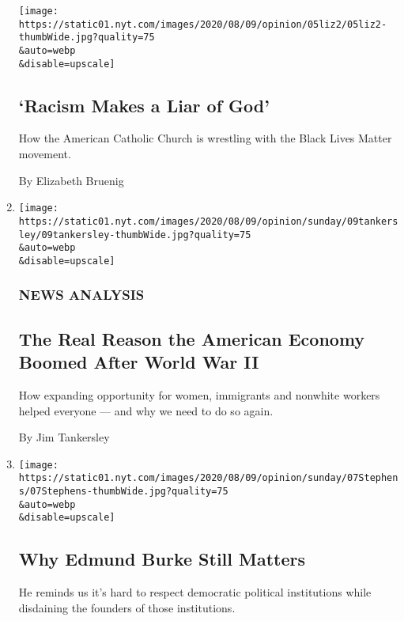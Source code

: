 \begin{enumerate}
  \texttt{[image: https://static01.nyt.com/images/2020/08/09/opinion/05liz2/05liz2-thumbWide.jpg?quality=75\\\&auto=webp\\\&disable=upscale]}

  \hypertarget{racism-makes-a-liar-of-god}{%
  \subsection{`Racism Makes a Liar of
  God'}\label{racism-makes-a-liar-of-god}}

  How the American Catholic Church is wrestling with the Black Lives
  Matter movement.

  By Elizabeth Bruenig
\item
  \href{/2020/08/06/sunday-review/middle-class-prosperity.html}{}

  \texttt{[image: https://static01.nyt.com/images/2020/08/09/opinion/sunday/09tankersley/09tankersley-thumbWide.jpg?quality=75\\\&auto=webp\\\&disable=upscale]}

  \hypertarget{news-analysis}{%
  \subsubsection{NEWS ANALYSIS}\label{news-analysis}}

  \hypertarget{the-real-reason-the-american-economy-boomed-after-world-war-ii}{%
  \subsection{The Real Reason the American Economy Boomed After World
  War
  II}\label{the-real-reason-the-american-economy-boomed-after-world-war-ii}}

  How expanding opportunity for women, immigrants and nonwhite workers
  helped everyone --- and why we need to do so again.

  By Jim Tankersley
\item
  \href{/2020/08/05/opinion/sunday/edmund-burke.html}{}

  \texttt{[image: https://static01.nyt.com/images/2020/08/09/opinion/sunday/07Stephens/07Stephens-thumbWide.jpg?quality=75\\\&auto=webp\\\&disable=upscale]}

  \hypertarget{why-edmund-burke-still-matters}{%
  \subsection{Why Edmund Burke Still
  Matters}\label{why-edmund-burke-still-matters}}

  He reminds us it's hard to respect democratic political institutions
  while disdaining the founders of those institutions.


\end{enumerate}
